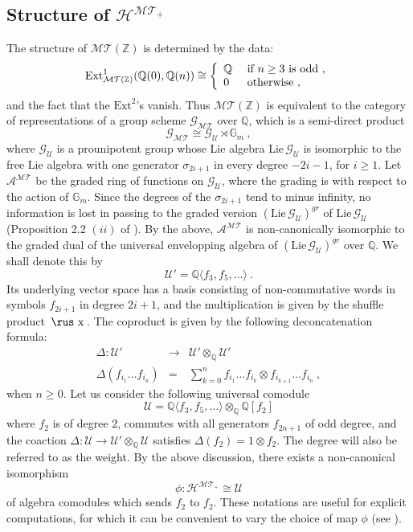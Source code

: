 \documentclass[10pt]{amsart}
\theoremstyle{definition}
\theoremstyle{remark}
\numberwithin{equation}{section}
\newcommand{\Z}{\mathbb Z}
\newcommand{\sha}{\, \hbox{\rus x} \,}
\newcommand{\Homt}{\mathcal{H^{MT_+}}}
\newcommand{\MT}{\mathcal{MT}}
\newcommand{\GMT}{\mathcal{G_{MT}}}
\newcommand{\G}{\mathbb{G}}
\newcommand{\GU}{\mathcal{G}_{\mathcal{U}}}
\newcommand{\Q}{\mathbb Q}
\newcommand{\U}{\mathcal{U}}
\newcommand{\Amt}{\mathcal{A}^{\MT}}
\begin{document}
\subsection{Structure of $\Homt$}
The structure of $\MT(\Z)$ is determined  by the data:
$$\mathrm{Ext}_{\MT(\Z)}^1(\Q(0),\Q(n)) \cong \left\{
                           \begin{array}{ll}
                             \Q\  & \hbox{if } n\geq 3 \hbox{ is odd}\ ,  \nonumber \\
                             0\   & \hbox{otherwise} \ ,
                           \end{array}
                         \right.
$$
 and the fact that the $\mathrm{Ext}^2$'s vanish.  Thus $\MT(\Z)$ is equivalent to the category of representations of a group  scheme $\GMT$ over $\Q$, which is a semi-direct product
 $$ \GMT\cong  \GU \rtimes \mathbb{G}_m \ ,$$
 where $\GU$ is a prounipotent group whose Lie algebra $\mathrm{Lie}\, \GU$ is isomorphic to the free Lie algebra with one generator $\sigma_{2i+1}$ in every degree 
 $-2i-1$, for $i\geq 1$.
Let  $\Amt$ be  the graded  ring of functions on $\GU$,  where the  grading is  with respect to the action of $\G_m$. 
Since the degrees of the $\sigma_{2i+1}$ tend to minus infinity, no information is   lost in passing to  the graded  version  $(\mathrm{Lie}\, \GU)^{gr}$ 
of  $ \mathrm{Lie}\, \GU$ (Proposition 2.2 $(ii)$ of \cite{DG}). 
By the above, $\Amt$  is  non-canonically isomorphic to the graded dual of the universal envelopping algebra of $(\mathrm{Lie}\, \GU)^{gr}$ over $\Q$. 
 We shall denote this by 
 $$\U' = \Q\langle f_3,f_5,\ldots \rangle\ .$$
Its underlying vector space has  a basis consisting of   non-commutative words in symbols $f_{2i+1}$ in degree $2i+1$,  and the multiplication is given by the shuffle product $\sha$.  The coproduct
 is given by  the following  
 deconcatenation formula: 
  \begin{eqnarray} \label{Udelta}
 \Delta:\U' & \rightarrow  & \U' \otimes_{\Q} \U'  \\
\Delta(f_{i_1}\ldots f_{i_n}) & =  &  \sum_{k=0}^{n} f_{i_1}\ldots f_{i_{k}}\otimes  f_{i_{k+1}}\ldots f_{i_n}  \ , \nonumber
\end{eqnarray}
when $n\geq 0$. Let us consider the following universal comodule
\begin{equation}
\U=  \Q\langle f_3,f_5,\ldots \rangle \otimes_{\Q}  \Q[f_2]
\end{equation}
where $f_2$  is of degree $2$,  commutes with all generators $f_{2n+1}$ of odd degree, and the coaction $\Delta: \U \rightarrow \U' \otimes_{\Q} \U$ satisfies $\Delta(f_2) =1 \otimes f_2$.  The degree will also be referred to as the weight.
By the above discussion,   there exists  a non-canonical isomorphism 
\begin{equation} \label{HisomU}
\phi:\Homt\cong \U 
\end{equation} 
 of algebra comodules which sends $f_2$ to $f_2$.   These notations are useful for explicit  computations, for which it can be  convenient to vary the choice of map $\phi$  (see \cite{Br}).
\end{document}
